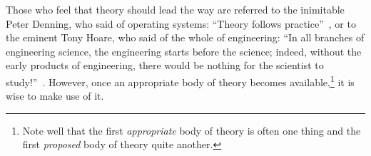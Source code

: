 Those who feel that theory should lead the way are referred to the
inimitable Peter Denning, who said of operating systems:
``Theory follows practice''~\cite{Denning:2015:POF:2830903.2830904},
or to the eminent Tony Hoare, who said of the whole of engineering:
``In all branches of engineering science, the engineering starts before
the science; indeed, without the early products of engineering, there
would be nothing for the scientist to
study!''~\cite{RichardMorris2007TonyHoareInterview}.
However, once an appropriate body of theory becomes available,\footnote{
	Note well that the first \emph{appropriate} body of theory is often one
	thing and the first \emph{proposed} body of theory quite another.}
it is wise to make use of it.



